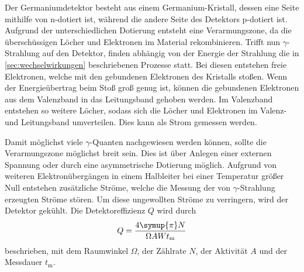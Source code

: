 Der Germaniumdetektor besteht aus einem Germanium-Kristall,
dessen eine Seite mithilfe von n-dotiert ist,
während die andere Seite des Detektors p-dotiert ist.
Aufgrund der unterschiedlichen Dotierung entsteht eine Verarmungszone,
da die überschüssigen Löcher und Elektronen im Material rekombinieren.
Trifft nun $\gamma$-Strahlung auf den Detektor,
finden abhängig von der Energie der Strahlung die in \autoref{sec:wechselwirkungen} beschriebenen Prozesse statt.
Bei diesen entstehen freie Elektronen,
welche mit den gebundenen Elektronen des Kristalls stoßen.
Wenn der Energieübertrag beim Stoß groß genug ist,
können die gebundenen Elektronen aus dem Valenzband in das Leitungsband gehoben werden.
Im Valenzband entstehen so weitere Löcher,
sodass sich die Löcher und Elektronen im Valenz- und Leitungsband umverteilen.
Dies kann als Strom gemessen werden.

Damit möglichst viele $\gamma$-Quanten nachgewiesen werden können,
sollte die Verarmungszone möglichst breit sein.
Dies ist über Anlegen einer externen Spannung
oder durch eine asymmetrische Dotierung möglich.
Aufgrund von weiteren Elektronübergängen in einem Halbleiter bei einer Temperatur größer Null entstehen zusätzliche Ströme,
welche die Messung der von $\gamma$-Strahlung erzeugten Ströme stören.
Um diese ungewollten Ströme zu verringern,
wird der Detektor gekühlt.
Die Detektoreffizienz $Q$ wird durch
\begin{equation}
    Q = \frac{4 \symup{\pi} N}{\Omega A W t_\text{m}}
    \label{eqn:effizienz}
\end{equation}
beschrieben,
mit dem Raumwinkel $\Omega$,
der Zählrate $N$,
der Aktivität $A$ und der Messdauer $t_\text{m}$.
